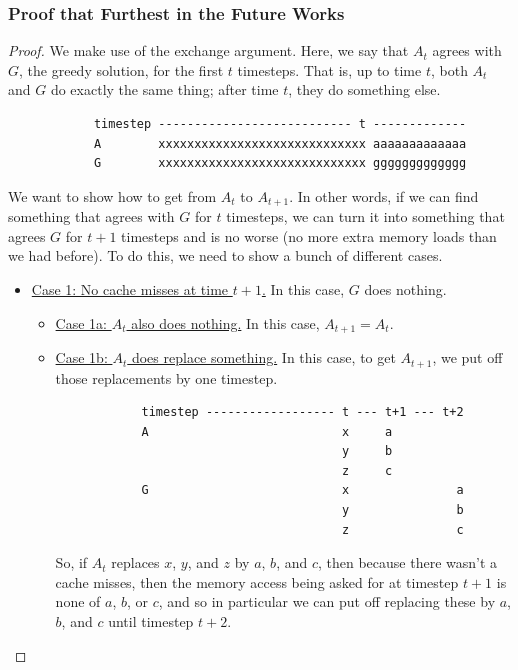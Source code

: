 \documentclass[letterpaper]{article}
\begin{document}
\subsubsection{Proof that Furthest in the Future Works}
\begin{mdframed}[]
    \begin{proof}
        We make use of the exchange argument. Here, we say that $A_t$ agrees with $G$, the greedy solution, for the first $t$ timesteps. That is, up to time $t$, both $A_t$ and $G$ do exactly the same thing; after time $t$, they do something else. 
        \begin{verbatim}
            timestep --------------------------- t -------------
            A        xxxxxxxxxxxxxxxxxxxxxxxxxxxxx aaaaaaaaaaaaa
            G        xxxxxxxxxxxxxxxxxxxxxxxxxxxxx ggggggggggggg
        \end{verbatim}
        We want to show how to get from $A_t$ to $A_{t + 1}$. In other words, if we can find something that agrees with $G$ for $t$ timesteps, we can turn it into something that agrees $G$ for $t + 1$ timesteps and is no worse (no more extra memory loads than we had before). To do this, we need to show a bunch of different cases. 
        \begin{itemize}
            \item \underline{Case 1: No cache misses at time $t + 1$.} In this case, $G$ does nothing. 
            \begin{itemize}
                \item \underline{Case 1a: $A_t$ also does nothing.} In this case, $A_{t + 1} = A_t$. 
                \item \underline{Case 1b: $A_t$ does replace something.} In this case, to get $A_{t + 1}$, we put off those replacements by one timestep. 
        \begin{verbatim}
            timestep ------------------ t --- t+1 --- t+2
            A                           x     a
                                        y     b
                                        z     c
            G                           x               a
                                        y               b
                                        z               c
        \end{verbatim}
                So, if $A_t$ replaces $x$, $y$, and $z$ by $a$, $b$, and $c$, then because there wasn't a cache misses, then the memory access being asked for at timestep $t + 1$ is none of $a$, $b$, or $c$, and so in particular we can put off replacing these by $a$, $b$, and $c$ until timestep $t + 2$. 
            \end{itemize}


\end{itemize}
\end{proof}
\end{mdframed}
\end{document}
